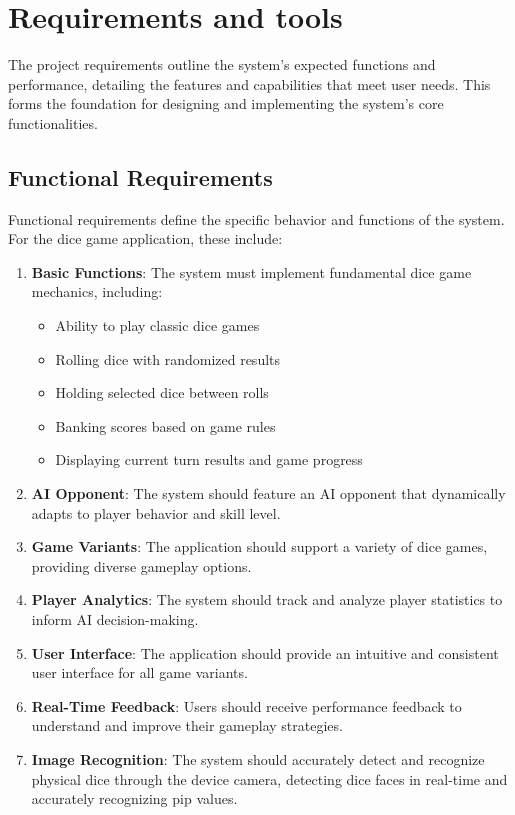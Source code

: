 
\chapter{Requirements and tools}
\label{chap:requirements-and-tools}

The project requirements outline the system's expected functions and performance, detailing the features and capabilities that meet user needs. This forms the foundation for designing and implementing the system's core functionalities.

\section{Functional Requirements}

Functional requirements define the specific behavior and functions of the system. For the dice game application, these include:

\begin{enumerate}
    \item {\bfseries Basic Functions}: The system must implement fundamental dice game mechanics, including:
    \begin{itemize}
        \item Ability to play classic dice games
        \item Rolling dice with randomized results
        \item Holding selected dice between rolls
        \item Banking scores based on game rules
        \item Displaying current turn results and game progress
    \end{itemize}
    \item {\bfseries AI Opponent}: The system should feature an AI opponent that dynamically adapts to player behavior and skill level.
    \item {\bfseries Game Variants}: The application should support a variety of dice games, providing diverse gameplay options.
    \item {\bfseries Player Analytics}: The system should track and analyze player statistics to inform AI decision-making.
    \item {\bfseries User Interface}: The application should provide an intuitive and consistent user interface for all game variants.
    \item {\bfseries Real-Time Feedback}: Users should receive performance feedback to understand and improve their gameplay strategies.
    \item {\bfseries Image Recognition}: The system should accurately detect and recognize physical dice through the device camera, detecting dice faces in real-time and accurately recognizing pip values.
\end{enumerate}


